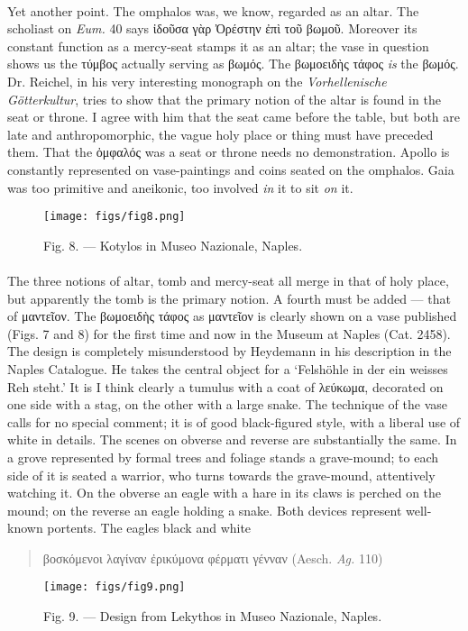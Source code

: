 \documentclass[a4paper, 11pt, oneside, polutonikogreek, english]{article}
\begin{document}
\paragraph{}
Yet another point. The omphalos was, we know, regarded as an altar. The scholiast on \emph{Eum.} 40 says ἰδοῦσα γὰρ Ὀρέστην ἐπὶ τοῦ βωμοῦ. Moreover its constant function as a mercy-seat stamps it as an altar; the vase in question shows us the τύμβος actually serving as βωμός. The βωμοειδὴς τάφος \emph{is} the βωμός. Dr. Reichel, in his very interesting monograph on the \emph{Vorhellenische Götterkultur}, tries to show that the primary notion of the altar is found in the seat or throne. I agree with him that the seat came before the table, but both are late and anthropomorphic, the vague holy place or thing must have preceded them. That the ὀμφαλός was a seat or throne needs no demonstration. Apollo is constantly represented on vase-paintings and coins seated on the omphalos. Gaia was too primitive and aneikonic, too involved \emph{in} it to sit \emph{on} it.
\begin{figure}[H]
\centering
\texttt{[image: figs/fig8.png]}
\caption{\Fontauri Fig. 8. --- Kotylos in Museo Nazionale, Naples.}
\end{figure}
\paragraph{}
The three notions of altar, tomb and mercy-seat all merge in that of holy place, but apparently the tomb is the primary notion. A fourth must be added --- that of μαντεῖον. The βωμοειδὴς τάφος as μαντεῖον is clearly shown on a vase published (Figs. 7 and 8) for the first time and now in the Museum at Naples (Cat. 2458). The design is completely misunderstood by Heydemann in his description in the Naples Catalogue. He takes the central object for a `Felshöhle in der ein weisses Reh steht.' It is I think clearly a tumulus with a coat of λεύκωμα, decorated on one side with a stag, on the other with a large snake. The technique of the vase calls for no special comment; it is of good black-figured style, with a liberal use of white in details. The scenes on obverse and reverse are substantially the same. In a grove represented by formal trees and foliage stands a grave-mound; to each side of it is seated a warrior, who turns towards the grave-mound, attentively watching it. On the obverse an eagle with a hare in its claws is perched on the mound; on the reverse an eagle holding a snake. Both devices represent well-known portents. The eagles black and white
\begin{quotation}
βοσκόμενοι λαγίναν ἐρικύμονα φέρματι γένναν (Aesch. \emph{Ag.} 110)
\end{quotation}
\begin{figure}[H]
\centering
\texttt{[image: figs/fig9.png]}
\caption{\Fontauri Fig. 9. --- Design from Lekythos in Museo Nazionale, Naples.}
\end{figure}
\end{document}
